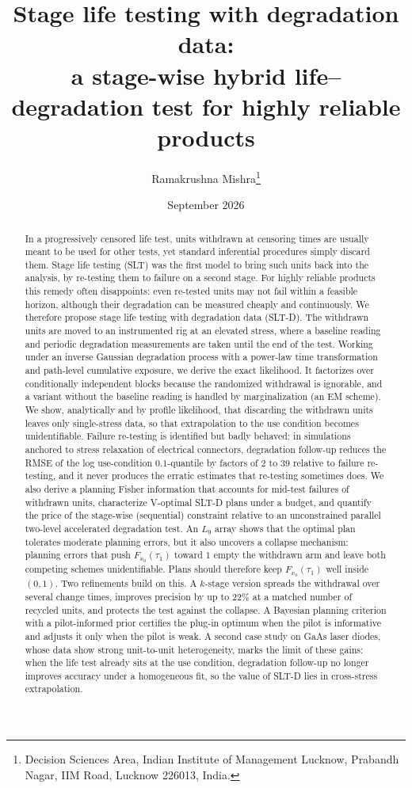 \documentclass[11pt]{article}
\title{Stage life testing with degradation data:\\ a stage-wise hybrid life--degradation test
for highly reliable products}
\author{Ramakrushna Mishra\thanks{Decision Sciences Area, Indian Institute of Management
Lucknow, Prabandh Nagar, IIM Road, Lucknow 226013, India.}}
\date{September 2026}
\newcommand{\SLTD}{SLT-D}
\begin{document}
\maketitle

\begin{abstract}
In a progressively censored life test, units withdrawn at censoring times are usually meant
to be used for other tests, yet standard inferential procedures simply discard them. Stage
life testing (SLT) was the first model to bring such units back into the analysis, by
re-testing them to failure on a second stage. For highly reliable products this remedy often
disappoints: even re-tested units may not fail within a feasible horizon, although their
degradation can be measured cheaply and continuously. We therefore propose stage life testing
with degradation data (\SLTD{}). The withdrawn units are moved to an instrumented rig at an
elevated stress, where a baseline reading and periodic degradation measurements are taken
until the end of the test. Working under an inverse Gaussian degradation process with a
power-law time transformation and path-level cumulative exposure, we derive the exact
likelihood. It factorizes over conditionally independent blocks because the randomized
withdrawal is ignorable, and a variant without the baseline reading is handled by
marginalization (an EM scheme). We show, analytically and by profile likelihood, that
discarding the withdrawn units leaves only single-stress data, so that extrapolation to the
use condition becomes unidentifiable. Failure re-testing is identified but badly behaved: in
simulations anchored to stress relaxation of electrical connectors, degradation follow-up
reduces the RMSE of the log use-condition $0.1$-quantile by factors of $2$ to $39$ relative to
failure re-testing, and it never produces the erratic estimates that re-testing sometimes
does. We also derive a planning
Fisher information that accounts for mid-test failures of withdrawn units, characterize
V-optimal \SLTD{} plans under a budget, and quantify the price of the stage-wise (sequential)
constraint relative to an unconstrained parallel two-level accelerated degradation test. An
$L_9$ array shows that the optimal plan tolerates moderate planning errors, but it also
uncovers a collapse mechanism: planning errors that push $F_{x_0}(\tau_1)$ toward $1$ empty
the withdrawn arm and leave both competing schemes unidentifiable. Plans should therefore keep
$F_{x_0}(\tau_1)$ well inside $(0,1)$. Two refinements build on this. A $k$-stage version
spreads the withdrawal over several change times, improves precision by up to $22\%$ at a
matched number of recycled units, and protects the test against the collapse. A Bayesian
planning criterion with a pilot-informed prior certifies the plug-in optimum when the pilot is
informative and adjusts it only when the pilot is weak. A second case study on GaAs laser
diodes, whose data show strong unit-to-unit heterogeneity, marks the limit of these gains:
when the life test already sits at the use condition, degradation follow-up no longer improves
accuracy under a homogeneous fit, so the value of \SLTD{} lies in cross-stress
extrapolation.
\end{abstract}
\end{document}
